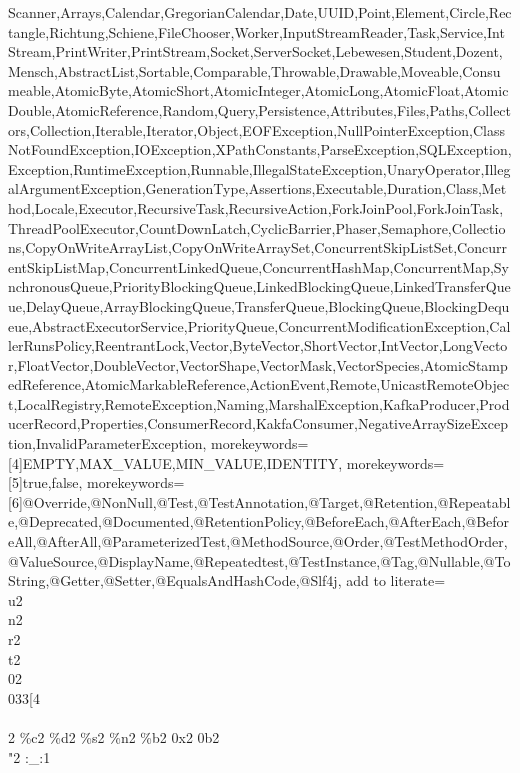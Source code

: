 {{Scanner,Arrays,Calendar,GregorianCalendar,Date,UUID,Point,Element,Circle,Rectangle,Richtung,Schiene,FileChooser,Worker,InputStreamReader,Task,Service,IntStream,PrintWriter,PrintStream,Socket,ServerSocket,Lebewesen,Student,Dozent,Mensch,AbstractList,Sortable,Comparable,Throwable,Drawable,Moveable,Consumeable,AtomicByte,AtomicShort,AtomicInteger,AtomicLong,AtomicFloat,AtomicDouble,AtomicReference,Random,Query,Persistence,Attributes,Files,Paths,Collectors,Collection,Iterable,Iterator,Object,EOFException,NullPointerException,ClassNotFoundException,IOException,XPathConstants,ParseException,SQLException,Exception,RuntimeException,Runnable,IllegalStateException,UnaryOperator,IllegalArgumentException,GenerationType,Assertions,Executable,Duration,Class,Method,Locale,Executor,RecursiveTask,RecursiveAction,ForkJoinPool,ForkJoinTask,ThreadPoolExecutor,CountDownLatch,CyclicBarrier,Phaser,Semaphore,Collections,CopyOnWriteArrayList,CopyOnWriteArraySet,ConcurrentSkipListSet,ConcurrentSkipListMap,ConcurrentLinkedQueue,ConcurrentHashMap,ConcurrentMap,SynchronousQueue,PriorityBlockingQueue,LinkedBlockingQueue,LinkedTransferQueue,DelayQueue,ArrayBlockingQueue,TransferQueue,BlockingQueue,BlockingDequeue,AbstractExecutorService,PriorityQueue,ConcurrentModificationException,CallerRunsPolicy,ReentrantLock,Vector,ByteVector,ShortVector,IntVector,LongVector,FloatVector,DoubleVector,VectorShape,VectorMask,VectorSpecies,AtomicStampedReference,AtomicMarkableReference,ActionEvent,Remote,UnicastRemoteObject,LocalRegistry,RemoteException,Naming,MarshalException,KafkaProducer,ProducerRecord,Properties,ConsumerRecord,KakfaConsumer,NegativeArraySizeException,InvalidParameterException},
morekeywords=[4]{EMPTY,MAX_VALUE,MIN_VALUE,IDENTITY},
morekeywords=[5]{true,false},
morekeywords=[6]{@Override,@NonNull,@Test,@TestAnnotation,@Target,@Retention,@Repeatable,@Deprecated,@Documented,@RetentionPolicy,@BeforeEach,@AfterEach,@BeforeAll,@AfterAll,@ParameterizedTest,@MethodSource,@Order,@TestMethodOrder,@ValueSource,@DisplayName,@Repeatedtest,@TestInstance,@Tag,@Nullable,@ToString,@Getter,@Setter,@EqualsAndHashCode,@Slf4j},
add to literate={\\u}{{}}2 {\\n}{{}}2 {\\r}{{}}2 {\\t}{{}}2 {\\0}{{}}2 {\\033[}{{\solGet{keywordB}{\textbackslash033[}}}4 {\\\\}{{}}2 {\%c}{{}}2 {\%d}{{}}2 {\%s}{{}}2 {\%n}{{}}2 {\%b}{{}}2 {0x}{{}}2 {0b}{{}}2 {\\"}{{}}2 {:_:}{{}}1%
}

